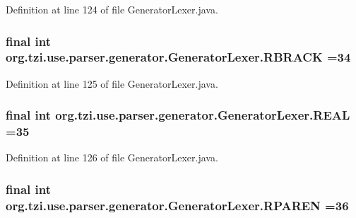 Definition at line 124 of file Generator\-Lexer.\-java.

\hypertarget{classorg_1_1tzi_1_1use_1_1parser_1_1generator_1_1_generator_lexer_ae433d1384f542a54827409ff790af4e2}{
\subsubsection[{R\-B\-R\-A\-C\-K}]{\setlength{\rightskip}{0pt plus 5cm}final int org.\-tzi.\-use.\-parser.\-generator.\-Generator\-Lexer.\-R\-B\-R\-A\-C\-K =34\hspace{0.3cm}{\ttfamily [static]}}}\label{classorg_1_1tzi_1_1use_1_1parser_1_1generator_1_1_generator_lexer_ae433d1384f542a54827409ff790af4e2}


Definition at line 125 of file Generator\-Lexer.\-java.

\hypertarget{classorg_1_1tzi_1_1use_1_1parser_1_1generator_1_1_generator_lexer_a0946d7042b8e6c5d8310f718f4e48757}{
\subsubsection[{R\-E\-A\-L}]{\setlength{\rightskip}{0pt plus 5cm}final int org.\-tzi.\-use.\-parser.\-generator.\-Generator\-Lexer.\-R\-E\-A\-L =35\hspace{0.3cm}{\ttfamily [static]}}}\label{classorg_1_1tzi_1_1use_1_1parser_1_1generator_1_1_generator_lexer_a0946d7042b8e6c5d8310f718f4e48757}


Definition at line 126 of file Generator\-Lexer.\-java.

\hypertarget{classorg_1_1tzi_1_1use_1_1parser_1_1generator_1_1_generator_lexer_a3a87822ef7f8ef8c34da45226eb9d981}{
\subsubsection[{R\-P\-A\-R\-E\-N}]{\setlength{\rightskip}{0pt plus 5cm}final int org.\-tzi.\-use.\-parser.\-generator.\-Generator\-Lexer.\-R\-P\-A\-R\-E\-N =36\hspace{0.3cm}{\ttfamily [static]}}}\label{classorg_1_1tzi_1_1use_1_1parser_1_1generator_1_1_generator_lexer_a3a87822ef7f8ef8c34da45226eb9d981}



